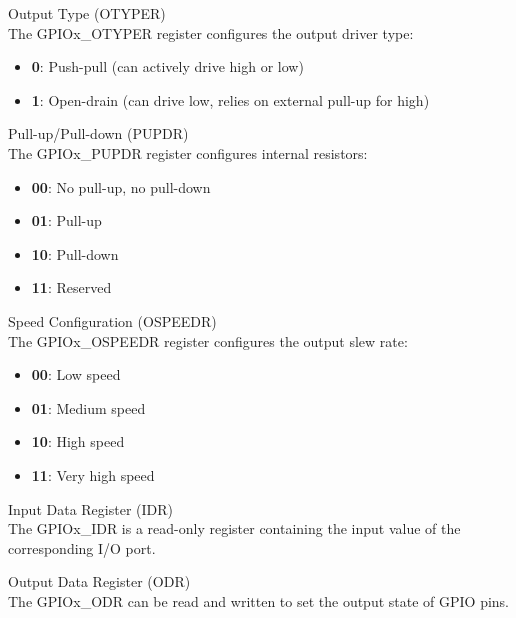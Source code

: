\begin{definition}{Output Type (OTYPER)}\\
The GPIOx\_OTYPER register configures the output driver type:
\begin{itemize}
    \item \textbf{0}: Push-pull (can actively drive high or low)
    \item \textbf{1}: Open-drain (can drive low, relies on external pull-up for high)
\end{itemize}
\end{definition}

\begin{definition}{Pull-up/Pull-down (PUPDR)}\\
The GPIOx\_PUPDR register configures internal resistors:
\begin{itemize}
    \item \textbf{00}: No pull-up, no pull-down
    \item \textbf{01}: Pull-up
    \item \textbf{10}: Pull-down
    \item \textbf{11}: Reserved
\end{itemize}
\end{definition}

\begin{definition}{Speed Configuration (OSPEEDR)}\\
The GPIOx\_OSPEEDR register configures the output slew rate:
\begin{itemize}
    \item \textbf{00}: Low speed
    \item \textbf{01}: Medium speed
    \item \textbf{10}: High speed
    \item \textbf{11}: Very high speed
\end{itemize}
\end{definition}

\begin{definition}{Input Data Register (IDR)}\\
The GPIOx\_IDR is a read-only register containing the input value of the corresponding I/O port.
\end{definition}

\begin{definition}{Output Data Register (ODR)}\\
The GPIOx\_ODR can be read and written to set the output state of GPIO pins.
\end{definition}

